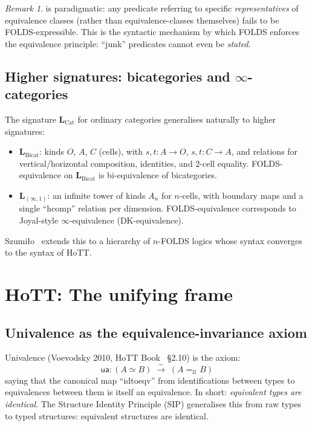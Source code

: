 \documentclass[12pt]{article}
\theoremstyle{definition}
\theoremstyle{remark}
\newtheorem{remark}[theorem]{Remark}
\begin{document}
\begin{remark}
 is paradigmatic: any predicate referring to specific
\emph{representatives} of equivalence classes (rather than equivalence-classes themselves)
fails to be FOLDS-expressible. This is the syntactic mechanism by which FOLDS enforces
the equivalence principle: ``junk'' predicates cannot even be \emph{stated}.
\end{remark}

\subsection{Higher signatures: bicategories and \texorpdfstring{$\infty$}{infinity}-categories}

The signature $\mathbf{L}_{\mathrm{Cat}}$ for ordinary categories generalises naturally
to higher signatures:
\begin{itemize}
\item $\mathbf{L}_{\mathrm{Bicat}}$: kinds $O$, $A$, $C$ (cells), with
$s,t:A\to O$, $s,t:C\to A$, and relations for vertical/horizontal composition,
identities, and 2-cell equality. FOLDS-equivalence on $\mathbf{L}_{\mathrm{Bicat}}$
is bi-equivalence of bicategories.
\item $\mathbf{L}_{(\infty,1)}$: an infinite tower of kinds $A_n$ for $n$-cells, with
boundary maps and a single ``hcomp'' relation per dimension. FOLDS-equivalence
corresponds to Joyal-style $\infty$-equivalence (DK-equivalence).
\end{itemize}
Szumi\l{}o~\cite{Szumilo2019} extends this to a hierarchy of $n$-FOLDS logics whose
syntax converges to the syntax of HoTT.

\section{HoTT: The unifying frame}
\label{sec:hott}

\subsection{Univalence as the equivalence-invariance axiom}

Univalence (Voevodsky 2010, HoTT Book~\cite{HoTTBook} \S2.10) is the axiom:
\[
\mathsf{ua}: (A\simeq B) \;\xrightarrow{\sim}\; (A=_{\mathcal{U}} B)
\]
saying that the canonical map ``$\mathrm{idtoeqv}$'' from identifications between types
to equivalences between them is itself an equivalence. In short: \emph{equivalent types
are identical}. The Structure Identity Principle (SIP) generalises this from raw types to
typed structures: equivalent structures are identical.
\end{document}
